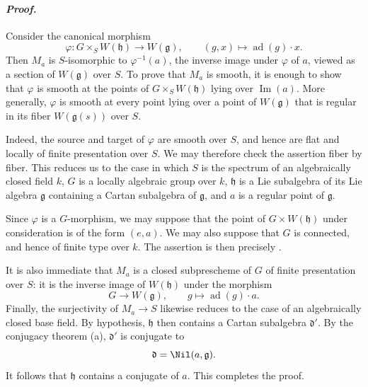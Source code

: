 \paragraph{\textit{Proof.}}
Consider the canonical morphism
\[
  \varphi\colon G\times_S W(\mathfrak h)\longrightarrow
  W(\mathfrak g),
  \qquad
  (g,x)\longmapsto\operatorname{ad}(g)\cdot x.
\]
Then \(M_a\) is \(S\)-isomorphic to \(\varphi^{-1}(a)\), the inverse
image under \(\varphi\) of \(a\), viewed as a section of
\(W(\mathfrak g)\) over \(S\). To prove that \(M_a\) is smooth, it
is enough to show that \(\varphi\) is smooth at the points of
\(G\times_S W(\mathfrak h)\) lying over \(\operatorname{Im}(a)\).
More generally, \(\varphi\) is smooth at every point lying over a
point of \(W(\mathfrak g)\) that is regular in its fiber
\(W(\mathfrak g(s))\) over \(S\).

Indeed, the source and target of \(\varphi\) are smooth over \(S\),
and hence are flat and locally of finite presentation over \(S\).
We may therefore check the assertion fiber by fiber. This reduces
us to the case in which \(S\) is the spectrum of an algebraically
closed field \(k\), \(G\) is a locally algebraic group over \(k\),
\(\mathfrak h\) is a Lie subalgebra of its Lie algebra
\(\mathfrak g\) containing a Cartan subalgebra of \(\mathfrak g\),
and \(a\) is a regular point of \(\mathfrak g\).

Since \(\varphi\) is a \(G\)-morphism, we may suppose that the point
of \(G\times W(\mathfrak h)\) under consideration is of the form
\((e,a)\). We may also suppose that \(G\) is connected, and hence
of finite type over \(k\). The assertion is then precisely
.

It is also immediate that \(M_a\) is a closed subprescheme of \(G\)
of finite presentation over \(S\): it is the inverse image of
\(W(\mathfrak h)\) under the morphism
\[
  G\longrightarrow W(\mathfrak g),
  \qquad
  g\longmapsto\operatorname{ad}(g)\cdot a.
\]
Finally, the surjectivity of \(M_a\to S\) likewise reduces to the
case of an algebraically closed base field. By hypothesis,
\(\mathfrak h\) then contains a Cartan subalgebra
\(\mathfrak d'\). By the conjugacy theorem \textup{(a)},
\(\mathfrak d'\) is conjugate to
\[
  \mathfrak d=\Nil(a,\mathfrak g).
\]
It follows that \(\mathfrak h\) contains a conjugate of \(a\).
This completes the proof.


